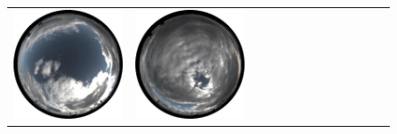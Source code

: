 \begin{figure}[!ht]
\begin{tabular}{@{}rcccccccccccc@{}}
    \includegraphics[width=\customwidth]{./figures/reconstruction/envmaps/20141011_152928.jpg} &
    \includegraphics[width=\customwidth]{./figures/reconstruction/envmaps/20141011_155928.jpg}

\end{tabular}
\end{figure}
